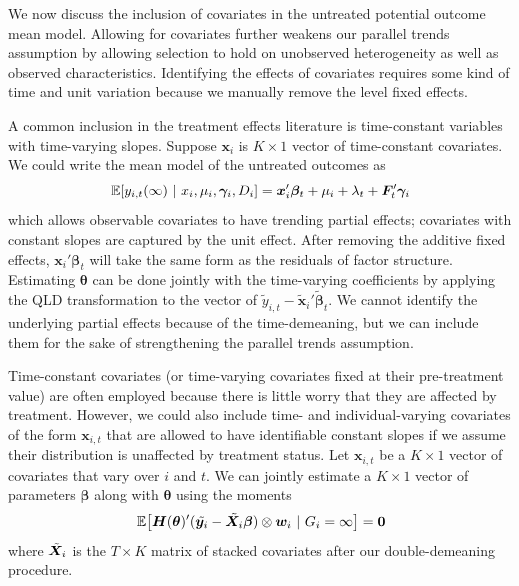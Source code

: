 \documentclass[12pt]{article}
\begin{document}

We now discuss the inclusion of covariates in the untreated potential outcome mean model. Allowing for covariates further weakens our parallel trends assumption by allowing selection to hold on unobserved heterogeneity as well as observed characteristics. Identifying the effects of covariates requires some kind of time and unit variation because we manually remove the level fixed effects. 

A common inclusion in the treatment effects literature is time-constant variables with time-varying slopes. Suppose $\bm x_i$ is $K \times 1$ vector of time-constant covariates. We could write the mean model of the untreated outcomes as 
\begin{equation}
    \expec{y_{i,t}(\infty)}{x_i, \mu_i, \bm \gamma_i, D_i} = \bm x_i' \bm \beta_t + \mu_i + \lambda_t + \bm{F}_t' \bm \gamma_i
\end{equation}
which allows observable covariates to have trending partial effects; covariates with constant slopes are captured by the unit effect. After removing the additive fixed effects, $\bm x_i' \bm \beta_t$ will take the same form as the residuals of factor structure. Estimating $\bm{\theta}$ can be done jointly with the time-varying coefficients by applying the QLD transformation to the vector of $\tilde{y}_{i,t} - \tilde{\bm x}_i' \tilde{\bm \beta}_t$. We cannot identify the underlying partial effects because of the time-demeaning, but we can include them for the sake of strengthening the parallel trends assumption.

Time-constant covariates (or time-varying covariates fixed at their pre-treatment value) are often employed because there is little worry that they are affected by treatment. However, we could also include time- and individual-varying covariates of the form $\bm x_{i,t}$ that are allowed to have identifiable constant slopes if we assume their distribution is unaffected by treatment status. Let $\bm x_{i,t}$ be a $K \times 1$ vector of covariates that vary over $i$ and $t$. We can jointly estimate a $K \times 1$ vector of parameters $\bm \beta$ along with $\bm{\theta}$ using the moments
\begin{equation}
    \expec{\bm H(\bm{\theta})' (\tilde{\bm y_i} - \tilde{\bm X_i} \bm \beta) \otimes \bm w_i}{G_i = \infty} = \bm 0
\end{equation}
where $\Tilde{\bm X}_i$ is the $T \times K$ matrix of stacked covariates after our double-demeaning procedure.
\end{document}
